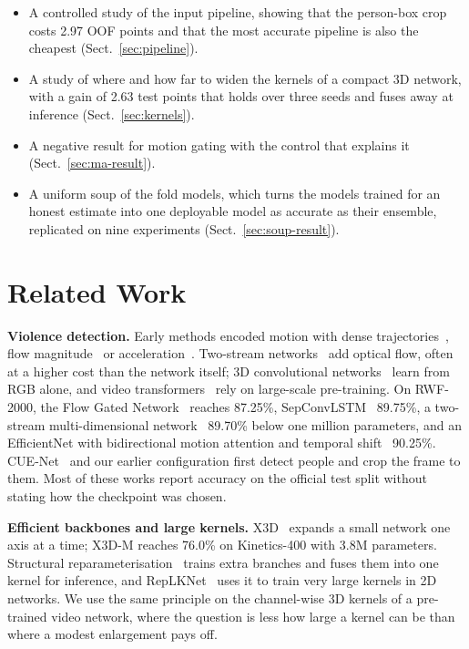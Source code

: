 \documentclass[runningheads]{llncs}
\begin{document}
\begin{itemize}
  \item A controlled study of the input pipeline, showing that the
    person-box crop costs 2.97 OOF points and that the most accurate
    pipeline is also the cheapest (Sect.~\ref{sec:pipeline}).
  \item A study of where and how far to widen the kernels of a compact 3D
    network, with a gain of 2.63 test points that holds over three seeds
    and fuses away at inference (Sect.~\ref{sec:kernels}).
  \item A negative result for motion gating with the control that explains
    it (Sect.~\ref{sec:ma-result}).
  \item A uniform soup of the fold models, which turns the models trained
    for an honest estimate into one deployable model as accurate as their
    ensemble, replicated on nine experiments (Sect.~\ref{sec:soup-result}).
\end{itemize}

\section{Related Work}

\textbf{Violence detection.} Early methods encoded motion with dense
trajectories~\cite{idt}, flow magnitude~\cite{vif} or
acceleration~\cite{hockey}. Two-stream networks~\cite{twostream} add
optical flow, often at a higher cost than the network itself; 3D
convolutional networks~\cite{c3d,i3d,slowfast,x3d} learn from RGB alone,
and video transformers~\cite{timesformer,videoswin} rely on large-scale
pre-training. On RWF-2000, the Flow Gated Network~\cite{rwf2000} reaches
87.25\%, SepConvLSTM~\cite{sepconvlstm} 89.75\%, a two-stream
multi-dimensional network~\cite{mdcn} 89.70\% below one million
parameters, and an EfficientNet with bidirectional motion attention and
temporal shift~\cite{biltma} 90.25\%. CUE-Net~\cite{cuenet} and our
earlier configuration first detect people and crop the frame to them. Most
of these works report accuracy on the official test split without stating how
the checkpoint was chosen.

\textbf{Efficient backbones and large kernels.} X3D~\cite{x3d} expands a
small network one axis at a time; X3D-M reaches 76.0\% on Kinetics-400 with
3.8M parameters. Structural reparameterisation~\cite{repvgg,acnet} trains
extra branches and fuses them into one kernel for inference, and
RepLKNet~\cite{replknet,unireplknet} uses it to train very large kernels in
2D networks. We use the same principle on the channel-wise 3D kernels of a
pre-trained video network, where the question is less how large a kernel
can be than where a modest enlargement pays off.
\end{document}
